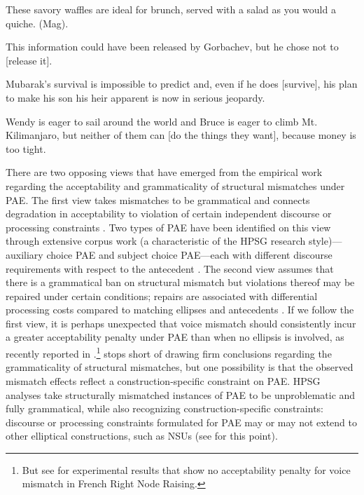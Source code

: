 {{\ea These savory waffles are ideal for brunch, served with a salad as you would a quiche. (Mag).\z
}

\eal

\ex This information could have been released by Gorbachev, but he chose not to [release it]. \citep[37]{Hardt1993} \label{27}

\ex Mubarak's survival is impossible to predict and, even if he does [survive], his plan to make his son his heir apparent is now in serious jeopardy. \citep{Miller2014a} \label{28}

\ex Wendy is eager to sail around the world and Bruce is eager to climb Mt. Kilimanjaro, but neither of them can [do the things they want], because money is too tight. \citep{Webber79a} \label{29}
\zl

There are two opposing views that have emerged from the empirical work regarding the acceptability and grammaticality of structural mismatches under PAE. The first view takes mismatches to be grammatical and connects degradation in acceptability to violation of certain independent discourse \citep{Kehler2002, Miller2011, %
Miller2014, Miller2014a, Miller2014b} or processing constraints \citep{Kim2011}. Two types of PAE have been identified on this view through extensive corpus work (a characteristic of the HPSG research style)---auxiliary choice PAE and subject choice PAE---each with different discourse requirements with respect to the antecedent \citep{Miller2011, Miller2014a, Miller2014b}. The second view assumes that there is a grammatical ban on structural mismatch but violations thereof may be repaired under certain conditions; repairs are associated with differential processing costs compared to matching ellipses and antecedents \citep{Arregui2006, Grant2012}. If we follow the first view, it is perhaps unexpected that voice mismatch should consistently incur a greater acceptability penalty under PAE than when no ellipsis is involved, as recently reported in \citet{Kim2018}.\footnote{But see \citet{Abeille2016} for experimental results
that show no acceptability penalty for voice mismatch in French Right Node Raising.} \citet{Kim2018} stops short of drawing firm conclusions regarding the grammaticality of structural mismatches, but one possibility is that the observed mismatch effects reflect a construction-specific constraint on PAE. HPSG analyses take structurally mismatched instances of PAE to be unproblematic and fully grammatical, while also recognizing construction-specific constraints: discourse or processing constraints formulated for PAE may or may not extend to other elliptical constructions, such as NSUs (see \citealt{Abeille2016,Ginzburg2018} for this point).


}
